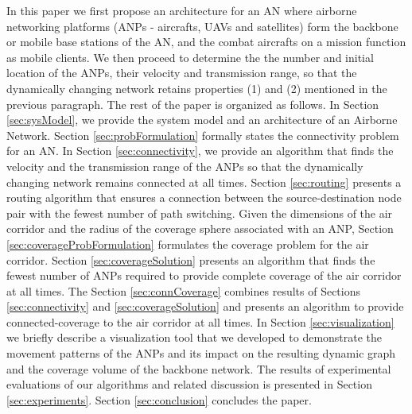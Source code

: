 \documentclass[10pt]{IEEEtran}
\begin{document}
In this paper we first propose an architecture for an AN where airborne networking platforms (ANPs - aircrafts, UAVs and satellites) form the backbone or mobile base stations of the AN, and the combat aircrafts on a mission function as mobile clients. We then proceed to determine the the number and initial location of the ANPs, their velocity and transmission range, so that the dynamically changing network retains properties (1) and (2) mentioned in the previous paragraph. The rest of the paper is organized as follows. In Section \ref{sec:sysModel}, we provide the system model and an architecture of an Airborne Network. Section \ref{sec:probFormulation} formally states the connectivity problem for an AN. In Section \ref{sec:connectivity}, we provide an algorithm that finds the velocity and the transmission range of the ANPs so that the dynamically changing  network remains connected at all times. Section \ref{sec:routing} presents a routing algorithm that ensures a connection between the source-destination  node pair with the fewest number of path switching.  Given the dimensions of the air corridor and the radius of the coverage sphere associated with an ANP, Section \ref{sec:coverageProbFormulation} formulates the coverage problem for the air corridor. Section \ref{sec:coverageSolution} presents an algorithm that finds the fewest number of ANPs required to provide complete coverage of the air corridor at all times. The Section \ref{sec:connCoverage} combines results of Sections \ref{sec:connectivity} and \ref{sec:coverageSolution} and presents an algorithm to provide connected-coverage to the air corridor at all times. In Section \ref{sec:visualization} we briefly describe a visualization tool that we developed to demonstrate the movement patterns of the ANPs and its impact on the resulting dynamic graph and the coverage volume of the backbone network. The results of experimental evaluations of our algorithms and related discussion is presented in Section \ref{sec:experiments}. Section \ref{sec:conclusion} concludes the paper.
\end{document}
